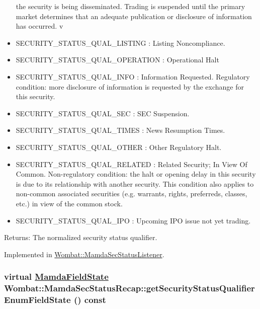 \begin{itemize}
the security is being disseminated. Trading is suspended until the primary market determines that an adequate publication or disclosure of information has occurred. v\item SECURITY\_\-STATUS\_\-QUAL\_\-LISTING : Listing Noncompliance. \item SECURITY\_\-STATUS\_\-QUAL\_\-OPERATION : Operational Halt \item SECURITY\_\-STATUS\_\-QUAL\_\-INFO : Information Requested. Regulatory condition: more disclosure of information is requested by the exchange for this security. \item SECURITY\_\-STATUS\_\-QUAL\_\-SEC : SEC Suspension. \item SECURITY\_\-STATUS\_\-QUAL\_\-TIMES : News Resumption Times. \item SECURITY\_\-STATUS\_\-QUAL\_\-OTHER : Other Regulatory Halt. \item SECURITY\_\-STATUS\_\-QUAL\_\-RELATED : Related Security; In View Of Common. Non-regulatory condition: the halt or opening delay in this security is due to its relationship with another security. This condition also applies to non-common associated securities (e.g. warrants, rights, preferreds, classes, etc.) in view of the common stock. \item SECURITY\_\-STATUS\_\-QUAL\_\-IPO : Upcoming IPO issue not yet trading. \end{itemize}


\begin{Desc}
\item[Returns:]The normalized security status qualifier. \end{Desc}


Implemented in \hyperlink{classWombat_1_1MamdaSecStatusListener_23df8eda9a22fae28680615ce0de4a0f}{Wombat::Mamda\-Sec\-Status\-Listener}.\hypertarget{classWombat_1_1MamdaSecStatusRecap_c5c0501e80486a14693e4acbb2b17b8e}{
\subsubsection[getSecurityStatusQualifierEnumFieldState]{\setlength{\rightskip}{0pt plus 5cm}virtual \hyperlink{namespaceWombat_93aac974f2ab713554fd12a1fa3b7d2a}{Mamda\-Field\-State} Wombat::Mamda\-Sec\-Status\-Recap::get\-Security\-Status\-Qualifier\-Enum\-Field\-State () const}}
\label{classWombat_1_1MamdaSecStatusRecap_c5c0501e80486a14693e4acbb2b17b8e}


